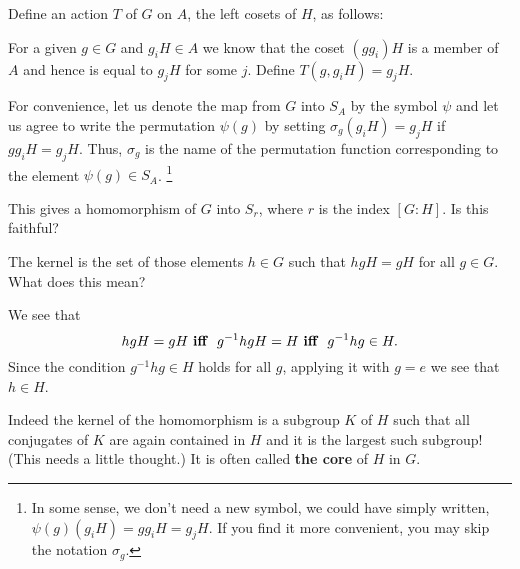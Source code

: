 \documentclass[12pt]{article}
\begin{document}
Define an action $T$ of $G$ on $A$, the left cosets of $H$,  as follows:

For a given $g\in G$ and $g_iH\in A$ we know that the coset $(gg_i)H$ is
a member of $A$ and hence is equal to $g_jH$ for some $j$.
Define $T(g,g_iH)=g_jH$.

For convenience, let us denote the map from $G$ into $S_{A}$ by the
symbol $\psi$ and let us agree to write the permutation $\psi(g)$ by
setting $\sigma_g(g_iH)=g_jH$ if $gg_iH=g_jH$. Thus, $\sigma_g$ is
the name of the permutation function corresponding to the element
$\psi(g)\in S_A$.
\footnote{In some sense, we don't need a new symbol, we could have
simply written, $\psi(g)(g_iH)=gg_iH=g_jH$. If you find it more
convenient, you may skip the notation $\sigma_g$.}

This gives a homomorphism of $G$ into $S_r$, where $r$ is the index $[G:H]$.
Is this faithful?

The kernel is the set of those elements $h\in G$ such that $hgH=gH$ for
all $g\in G$. What does this mean?

We see that
$$hgH=gH  ~~\mbox{\bf iff } ~~g^{-1}hgH = H  
 ~~ \mbox{\bf  iff   } ~~ g^{-1}hg \in H .$$
Since the condition $g^{-1}hg \in H$ holds for all $g$, applying it with
$g=e$ we see that $h\in H$.

Indeed the kernel of the homomorphism is a subgroup $K$ of $H$ such that
all conjugates of $K$ are again contained in $H$ and it is the largest
such subgroup!(This needs a little thought.) It is often called {\bf the
core} of $H$ in $G$.
\end{document}
